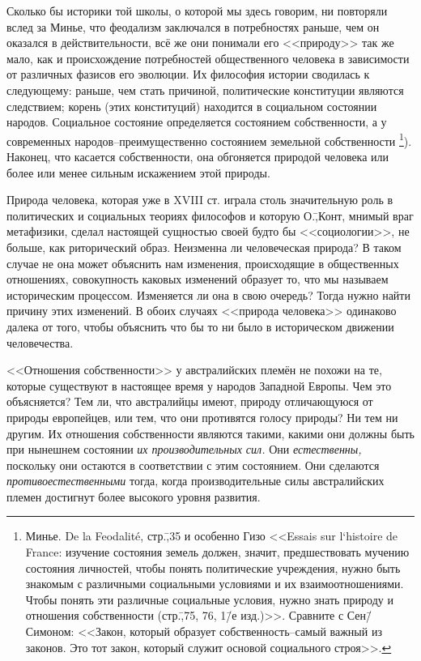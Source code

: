 Сколько бы историки той школы, о которой мы здесь говорим, ни повторяли вслед за Минье, что феодализм заключался в потребностях раньше, чем он оказался в действительности, всё же они понимали его <<природу>> так же мало, как и происхождение потребностей общественного человека в зависимости от различных фазисов его эволюции. Их философия истории сводилась к следующему: раньше, чем стать причиной, политические конституции являются следствием; корень (этих конституций) находится в социальном состоянии народов. Социальное состояние определяется состоянием собственности, а у современных народов\---преимущественно состоянием земельной собственности \footnote{Минье. De la Feodalit\'{e}, стр.\=,35 и особенно Гизо <<Essais sur l`histoire de France: изучение состояния земель должен, значит, предшествовать мучению состояния личностей, чтобы понять политические учреждения, нужно быть знакомым с различными социальными условиями и их взаимоотношениями. Чтобы понять эти различные социальные условия, нужно знать природу и отношения собственности (стр.\=,75, 76, 1\=/е изд.)>>. Сравните с Сен\=/Симоном: <<Закон, который образует собственность\---самый важный из законов. Это тот закон, который служит основой социального строя>>.}). Наконец, что касается собственности, она обгоняется природой человека или более или менее сильным искажением этой природы.

Природа человека, которая уже в XVIII ст. играла столь значительную роль в политических и социальных теориях философов и которую О.\=,Конт, мнимый враг метафизики, сделал настоящей сущностью своей будто бы <<социологии>>, не больше, как риторический образ. Неизменна ли человеческая природа? В таком случае не она может объяснить нам изменения, происходящие в общественных отношениях, совокупность каковых изменений образует то, что мы называем историческим процессом. Изменяется ли она в свою очередь? Тогда нужно найти причину этих изменений. В обоих случаях <<природа человека>> одинаково далека от того, чтобы объяснить что бы то ни было в историческом движении человечества.

<<Отношения собственности>> у австралийских племён не похожи на те, которые существуют в настоящее время у народов Западной Европы. Чем это объясняется? Тем ли, что австралийцы имеют, природу отличающуюся от природы европейцев, или тем, что они противятся голосу природы? Ни тем ни другим. Их отношения собственности являются такими, какими они должны быть при нынешнем состоянии \emph{их производительных сил.} Они \emph{естественны,} поскольку они остаются в соответствии с этим состоянием. Они сделаются \emph{противоестественными} тогда, когда производительные силы австралийских племен достигнут более высокого уровня развития.

